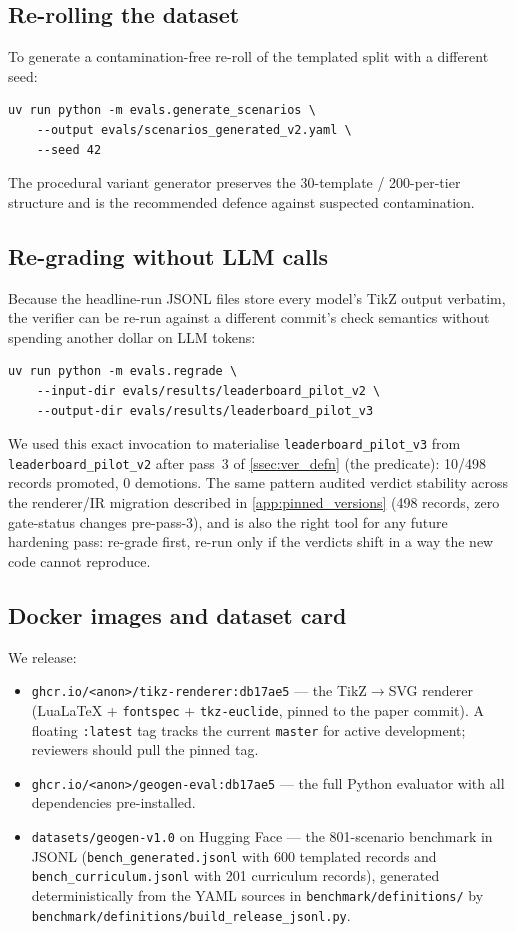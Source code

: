 \subsection{Re-rolling the dataset}

To generate a contamination-free re-roll of the templated split with a different seed:
\begin{lstlisting}
uv run python -m evals.generate_scenarios \
    --output evals/scenarios_generated_v2.yaml \
    --seed 42
\end{lstlisting}
The procedural variant generator preserves the 30-template / 200-per-tier structure and is the recommended defence against suspected contamination.

\subsection{Re-grading without LLM calls}

Because the headline-run JSONL files store every model's TikZ output verbatim, the verifier can be re-run against a different commit's check semantics without spending another dollar on LLM tokens:
\begin{lstlisting}
uv run python -m evals.regrade \
    --input-dir evals/results/leaderboard_pilot_v2 \
    --output-dir evals/results/leaderboard_pilot_v3
\end{lstlisting}
We used this exact invocation to materialise \texttt{leaderboard\_pilot\_v3} from \texttt{leaderboard\_pilot\_v2} after pass~3 of \cref{ssec:ver_defn} (the  predicate): 10/498 records promoted, 0 demotions.
The same pattern audited verdict stability across the renderer/IR migration described in \cref{app:pinned_versions} (498 records, zero gate-status changes pre-pass-3), and is also the right tool for any future hardening pass: re-grade first, re-run only if the verdicts shift in a way the new code cannot reproduce.

\subsection{Docker images and dataset card}

We release:
\begin{itemize}
\item \texttt{ghcr.io/<anon>/tikz-renderer:db17ae5} --- the TikZ$\to$SVG renderer (LuaLaTeX + \texttt{fontspec} + \texttt{tkz-euclide}, pinned to the paper commit). A floating \texttt{:latest} tag tracks the current \texttt{master} for active development; reviewers should pull the pinned tag.
\item \texttt{ghcr.io/<anon>/geogen-eval:db17ae5} --- the full Python evaluator with all dependencies pre-installed.
\item \texttt{datasets/geogen-v1.0} on Hugging Face --- the 801-scenario benchmark in JSONL (\texttt{bench\_generated.jsonl} with 600 templated records and \texttt{bench\_curriculum.jsonl} with 201 curriculum records), generated deterministically from the YAML sources in \texttt{benchmark/definitions/} by \texttt{benchmark/definitions/build\_release\_jsonl.py}.
\end{itemize}

